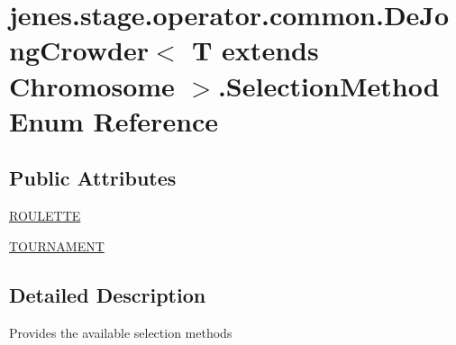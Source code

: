 \hypertarget{enumjenes_1_1stage_1_1operator_1_1common_1_1_de_jong_crowder_3_01_t_01extends_01_chromosome_01_4_1_1_selection_method}{\section{jenes.\-stage.\-operator.\-common.\-De\-Jong\-Crowder$<$ T extends Chromosome $>$.Selection\-Method Enum Reference}
\label{enumjenes_1_1stage_1_1operator_1_1common_1_1_de_jong_crowder_3_01_t_01extends_01_chromosome_01_4_1_1_selection_method}
}
\subsection*{Public Attributes}
\begin{DoxyCompactItemize}
\item 
\hyperlink{enumjenes_1_1stage_1_1operator_1_1common_1_1_de_jong_crowder_3_01_t_01extends_01_chromosome_01_4_1_1_selection_method_ac14f048e8f37a7410e5181147c07ce01}{R\-O\-U\-L\-E\-T\-T\-E}
\item 
\hyperlink{enumjenes_1_1stage_1_1operator_1_1common_1_1_de_jong_crowder_3_01_t_01extends_01_chromosome_01_4_1_1_selection_method_a46ad310865d9047eec57ee2efc92edf2}{T\-O\-U\-R\-N\-A\-M\-E\-N\-T}
\end{DoxyCompactItemize}


\subsection{Detailed Description}
Provides the available selection methods 


